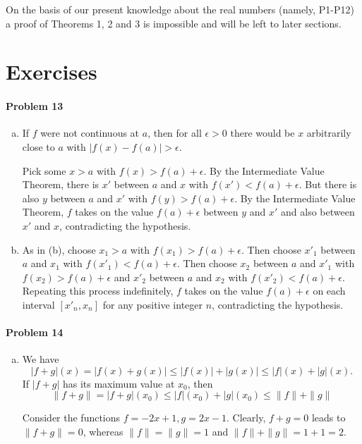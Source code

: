 \documentclass{article}
\begin{document}
On the basis of our present knowledge about the real numbers (namely, P1-P12)
a proof of Theorems 1, 2 and 3 is impossible and will be left to later
sections.

\section*{Exercises}

\paragraph{Problem 13}
\begin{enumerate}[(b)]
  \item If $f$ were not continuous at $a$, then for all $\epsilon > 0$ there
    would be $x$ arbitrarily close to $a$ with $|f(x) - f(a)| > \epsilon$.

    Pick some $x > a$ with $f(x) > f(a) + \epsilon$. By the Intermediate Value
    Theorem, there is $x'$ between $a$ and $x$ with $f(x') < f(a) + \epsilon$.
    But there is also $y$ between $a$ and $x'$ with $f(y) > f(a) + \epsilon$.
    By the Intermediate Value Theorem, $f$ takes on the value $f(a) + \epsilon$
    between $y$ and $x'$ and also between $x'$ and $x$, contradicting the
    hypothesis.
  \item As in (b), choose $x_1 > a$ with $f(x_1) > f(a) + \epsilon$. Then
    choose $x'_1$ between $a$ and $x_1$ with $f(x'_1) < f(a) + \epsilon$. Then
    choose $x_2$ between $a$ and $x'_1$ with $f(x_2) > f(a) + \epsilon$ and
    $x'_2$ between $a$ and $x_2$ with $f(x'_2) < f(a) + \epsilon$. Repeating
    this process indefinitely, $f$ takes on the value $f(a) + \epsilon$ on each
    interval $[x'_n, x_n]$ for any positive integer $n$, contradicting the
    hypothesis.
\end{enumerate}

\paragraph{Problem 14}
\begin{enumerate}[(b)]
  \item We have \[
      |f + g|(x) = |f(x) + g(x)| \leq |f(x)| + |g(x)| \leq |f|(x) + |g|(x).
  \] If $|f + g|$ has its maximum value at $x_0$, then \[
    \|f + g\| = |f + g|(x_0) \leq |f|(x_0) + |g|(x_0) \leq \|f\| + \|g\|
  \]

  Consider the functions $f = -2x + 1, g = 2x - 1$. Clearly, $f + g = 0$ leads
  to $\|f + g\| = 0$, whereas $\|f\| = \|g\| = 1$ and $\|f\| + \|g\| = 1 + 1 =
  2$.
\end{enumerate}
\end{document}
